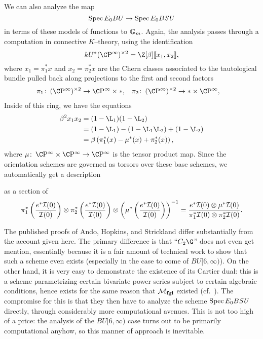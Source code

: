 \begin{remark}\label{BSUToBU}
We can also analyze the map \[\operatorname{Spec} E_0 BU \to \operatorname{Spec} E_0 B\mathit{SU}\] in terms of these models of functions to \(\mathbb G_m\).  Again, the analysis passes through a computation in connective \(K\)--theory, using the identification \[kU^*(\CP^\infty)^{\times 2} = \Z[\beta]\ps{x_1, x_2},\] where \(x_1 = \pi_1^* x\) and \(x_2 = \pi_2^* x\) are the Chern classes associated to the tautological bundle pulled back along projections to the first and second factors
\begin{align*}
\pi_1\co (\CP^\infty)^{\times 2} & \to \CP^\infty \times *, &
\pi_2\co (\CP^\infty)^{\times 2} & \to * \times \CP^\infty,
\end{align*}
Inside of this ring, we have the equations
\begin{align*}
\beta^2 x_1 x_2 & = (1 - \L_1)(1 - \L_2) \\
& = (1 - \L_1) - (1 - \L_1 \L_2) + (1 - \L_2) \\
& = \beta\left(\pi_1^*(x) - \mu^*(x) + \pi_2^*(x) \right),
\end{align*}
where \(\mu\co \CP^\infty \times \CP^\infty \to \CP^\infty\) is the tensor product map.  Since the orientation schemes are governed as torsors over these base schemes, we automatically get a description
\begin{center}
\end{center}
as a section of
\[\pi_1^* \left(\frac{e^* \mathcal{I}(0)}{\mathcal{I}(0)}\right) \otimes \pi_2^* \left(\frac{e^* \mathcal{I}(0)}{\mathcal{I}(0)}\right) \otimes \left(\mu^* \left(\frac{e^* \mathcal{I}(0)}{\mathcal{I}(0)}\right) \right)^{-1} = \frac{e^* \mathcal{I}(0) \otimes \mu^* \mathcal{I}(0)}{\pi_1^* \mathcal{I}(0) \otimes \pi_2^* \mathcal{I}(0)}.\]
\end{remark}

\begin{remark}\label{CUpper3Exists}
The published proofs of Ando, Hopkins, and Strickland differ substantially from the account given here.  The primary difference is that ``\(C_2 \G\)'' does not even get mention, essentially because it is a fair amount of technical work to show that such a scheme even exists (especially in the case to come of \(BU[6, \infty)\)).  On the other hand, it is very easy to demonstrate the existence of its Cartier dual: this is a scheme parametrizing certain bivariate power series subject to certain algebraic conditions, hence exists for the same reason that \(\mathcal{M}_{\mathbf{fgl}}\) existed (cf.\ ).  The compromise for this is that they then have to analyze the scheme \(\operatorname{Spec} E_0 B\mathit{SU}\) directly, through considerably more computational avenues.  This is not too high of a price: the analysis of the \(BU[6, \infty)\) case turns out to be primarily computational anyhow, so this manner of approach is inevitable.
\end{remark}

